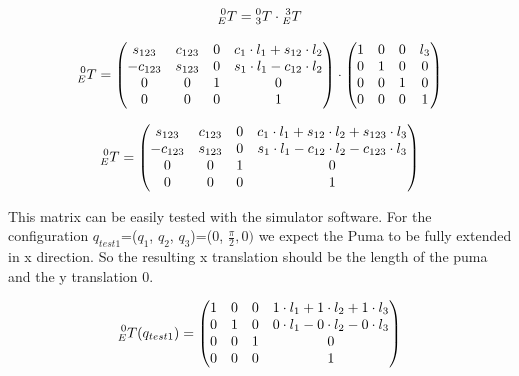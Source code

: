\begin{equation}
   \prescript{0}{E}{T} = \prescript{0}{3}{T} \cdot \prescript{3}{E}{T}
\end{equation}

\begin{equation}
   \prescript{0}{E}{T} = \begin{pmatrix} 
  s_{123} & c_{123} & 0 & c_1 \cdot l_1 + s_{12} \cdot l_2\\
   - c_{123} & s_{123} & 0& s_1 \cdot l_1 - c_{12} \cdot l_2\\
   0& 0 & 1 &  0       \\
   0 & 0 & 0 & 1\end{pmatrix} \cdot \begin{pmatrix} 
  1 & 0 & 0 & l_3\\
   0 & 1 & 0& 0\\
   0& 0 & 1 &  0       \\
   0 & 0 & 0 & 1\end{pmatrix}
   \label{eq:tsum}
\end{equation}

\begin{equation}
   \prescript{0}{E}{T} = \begin{pmatrix} 
  s_{123} & c_{123} & 0 & c_1 \cdot l_1 + s_{12} \cdot l_2 + s_{123} \cdot l_3\\
   -c_{123} & s_{123} & 0& s_1 \cdot l_1 - c_{12} \cdot l_2 - c_{123} \cdot l_3\\
  0& 0 & 1 &  0       \\
   0 & 0 & 0 & 1\end{pmatrix}
   \label{eq:TEFINAL}
\end{equation}

This matrix can be easily tested with the simulator software.
For the configuration $q_{test1}$=($q_1$, $q_2$, $q_3$)=(0, $\frac{\pi}{2},0)$ we expect the Puma to be fully extended in x direction. So the resulting x translation should be the length of the puma and the y translation 0. 

\begin{equation}
   \prescript{0}{E}{T}(q_{test1}) = \begin{pmatrix} 
  1 & 0 & 0 & 1 \cdot l_1 + 1 \cdot l_2 + 1 \cdot l_3\\
   0 & 1 & 0& 0 \cdot l_1 - 0 \cdot l_2 - 0 \cdot l_3\\
   0& 0 & 1 &  0       \\
   0 & 0 & 0 & 1\end{pmatrix}
\end{equation}

